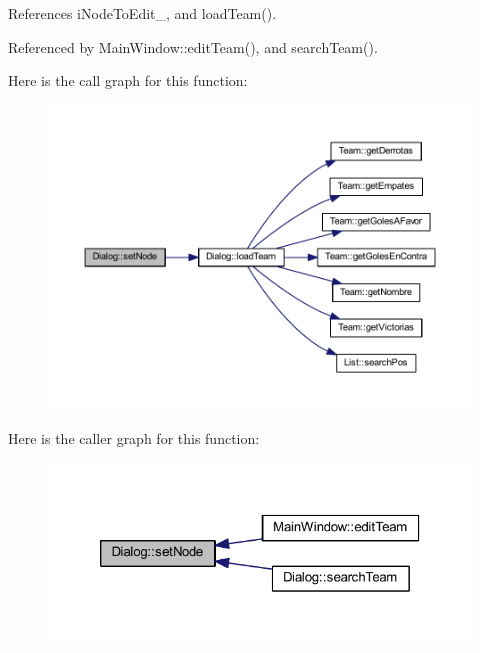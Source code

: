 References i\+Node\+To\+Edit\+\_\+, and load\+Team().



Referenced by Main\+Window\+::edit\+Team(), and search\+Team().



Here is the call graph for this function\+:\nopagebreak
\begin{figure}[H]
\begin{center}
\leavevmode
\includegraphics[width=350pt]{df/da9/class_dialog_a3fe34fdf51dce326e10b7b2eef8ae6ea_cgraph}
\end{center}
\end{figure}




Here is the caller graph for this function\+:\nopagebreak
\begin{figure}[H]
\begin{center}
\leavevmode
\includegraphics[width=320pt]{df/da9/class_dialog_a3fe34fdf51dce326e10b7b2eef8ae6ea_icgraph}
\end{center}
\end{figure}


\hypertarget{class_dialog_a03a550e5b4fa16614d27f8d4e2329e10}{}
